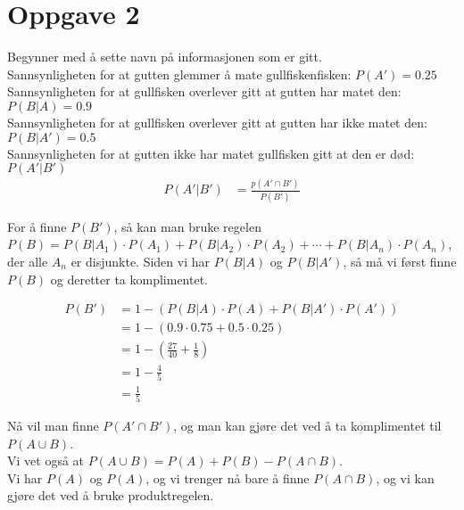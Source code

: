 \documentclass[12pt, a4paper]{article}
\begin{document}
\newpage

\section*{Oppgave 2}

Begynner med å sette navn på informasjonen som er gitt. \\
Sannsynligheten for at gutten glemmer å mate gullfiskenfisken: $P(A') = 0.25$ \\
Sannsynligheten for at gullfisken overlever gitt at gutten har matet den: $P(B | A) = 0.9$ \\
Sannsynligheten for at gullfisken overlever gitt at gutten har ikke matet den: $P(B | A') = 0.5$ \\
Sannsynligheten for at gutten ikke har matet gullfisken gitt at den er død: $P(A' | B')$ \\

\begin{equation}
    \begin{split}
        P(A' | B') &= \frac{p(A' \cap B')}{P(B')}
    \end{split}
\end{equation}

For å finne $P(B')$, så kan man bruke regelen $P(B) = P(B|A_1) \cdot P(A_1) + P(B|A_2) \cdot P(A_2) + \cdots + P(B|A_n) \cdot P(A_n)$, der alle $A_n$ er disjunkte.
Siden vi har $P(B|A)$ og $P(B|A')$, så må vi først finne $P(B)$ og deretter ta komplimentet.

\begin{equation}
    \begin{split}
        P(B') &= 1 - (P(B|A) \cdot P(A) + P(B|A') \cdot P(A')) \\
              &= 1 - (0.9 \cdot 0.75 + 0.5 \cdot 0.25) \\
              &= 1 - (\frac{27}{40} + \frac{1}{8}) \\
              &= 1 - \frac{4}{5} \\
              &= \frac{1}{5}
    \end{split}
\end{equation}

Nå vil man finne $P(A' \cap B')$, og man kan gjøre det ved å ta komplimentet til $P(A \cup B)$. \\
Vi vet også at $P(A \cup B) = P(A) + P(B) - P(A \cap B)$. \\
Vi har $P(A)$ og $P(A)$, og vi trenger nå bare å finne $P(A \cap B)$, og vi kan gjøre det ved å bruke produktregelen.
\end{document}
